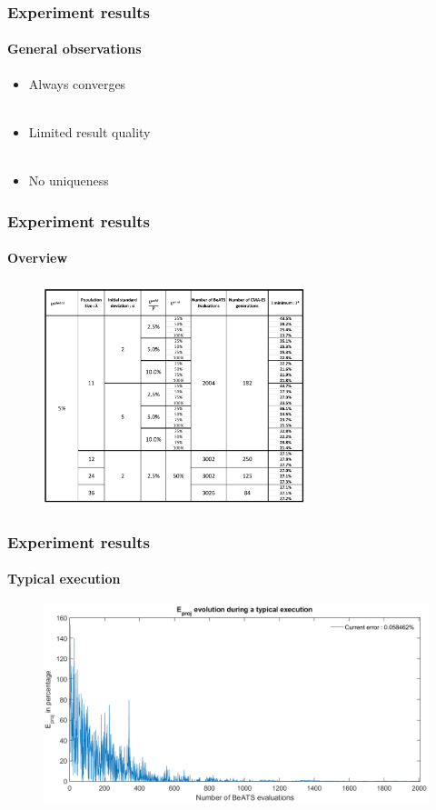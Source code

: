 \documentclass[fleqn]{beamer}
\begin{document}
\begin{frame}
	\frametitle{Experiment results}
	\framesubtitle{General observations}
	\begin{itemize}
		\item Always converges\\
		~\\
		\item Limited result quality\\
		~\\
		\item No uniqueness\\
	\end{itemize}	
\end{frame}

\begin{frame}
	\frametitle{Experiment results}
	\framesubtitle{Overview}
	\begin{figure}
		\centering
		\includegraphics[width=3in]{figures/results_array.png}
	\end{figure}
\end{frame}
	
\begin{frame}
	\frametitle{Experiment results}
	\framesubtitle{Typical execution}
	\begin{figure}
		\centering
		\includegraphics[width=4.5in]{figures/results_figures/eprojexample.png}
	\end{figure}
\end{frame}
\end{document}
